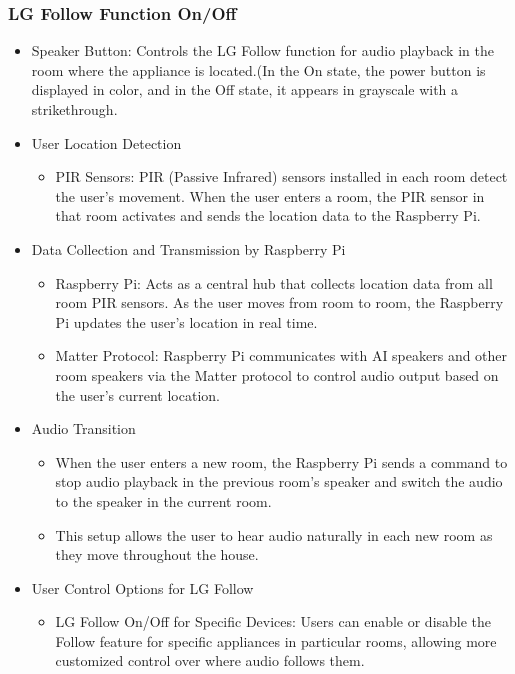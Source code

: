 \documentclass[conference]{IEEEtran}
\begin{document}
\subsubsection{LG Follow Function On/Off}
\begin{itemize}
    \item Speaker Button: Controls the LG Follow function for audio playback in the room where the appliance is located.(In the On state, the power button is displayed in color, and in the Off state, it appears in grayscale with a strikethrough.\\
    \item User Location Detection
\begin{itemize}
    \item PIR Sensors: PIR (Passive Infrared) sensors installed in each room detect the user’s movement. When the user enters a room, the PIR sensor in that room activates and sends the location data to the Raspberry Pi.\\
\end{itemize}
\end{itemize}
\begin{itemize}
    \item Data Collection and Transmission by Raspberry Pi
\begin{itemize}
    \item Raspberry Pi: Acts as a central hub that collects location data from all room PIR sensors. As the user moves from room to room, the Raspberry Pi updates the user’s location in real time.\\
    \item Matter Protocol: Raspberry Pi communicates with AI speakers and other room speakers via the Matter protocol to control audio output based on the user’s current location.\\
\end{itemize}
\end{itemize}
\begin{itemize}
    \item Audio Transition
\begin{itemize}
    \item When the user enters a new room, the Raspberry Pi sends a command to stop audio playback in the previous room’s speaker and switch the audio to the speaker in the current room.\\
    \item This setup allows the user to hear audio naturally in each new room as they move throughout the house.\\
\end{itemize}
\end{itemize}
\begin{itemize}
    \item User Control Options for LG Follow
\begin{itemize}
    \item LG Follow On/Off for Specific Devices: Users can enable or disable the Follow feature for specific appliances in particular rooms, allowing more customized control over where audio follows them.\\
\end{itemize}
\end{itemize}
\end{document}
